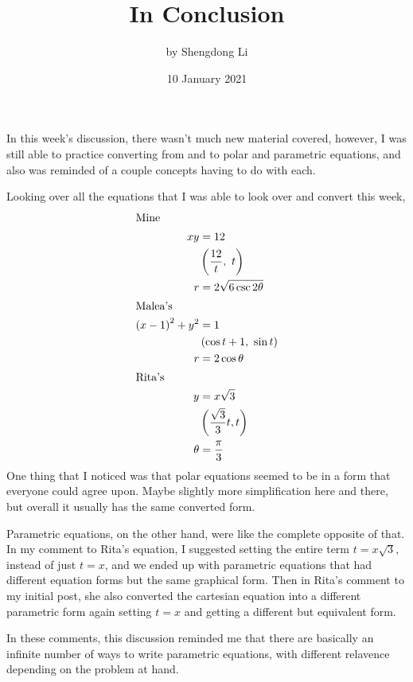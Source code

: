 \documentclass[12pt]{article}
\begin{document}
\title{In Conclusion}
\author{by Shengdong Li}
\date{10 January 2021}
\maketitle

In this week's discussion, there wasn't much new material covered, however, I was still able to practice converting from and to polar and parametric equations, and also was reminded of a couple concepts having to do with each.

Looking over all the equations that I was able to look over and convert this week,
\begin{align*}
  \intertext{Mine}
	xy                         & =12                   \\
	&\left(\frac{12}{t},\ t\right)                      \\
	r                          & =2\sqrt{6\csc2\theta} \\
  \intertext{Malea's}
	\left(x-1\right)^{2}+y^{2} & =1                    \\
	&\left(\cos t+1,\ \sin t\right)                     \\
	r                          & =2\cos\theta          \\
  \intertext{Rita's}
	y                          & =x\sqrt{3}            \\
	&\left(\frac{\sqrt{3}}{3}t,t\right)                 \\
	\theta                     & =\frac{\pi}{3}        \\
\end{align*}
One thing that I noticed was that polar equations seemed to be in a form that everyone could agree upon. Maybe slightly more simplification here and there, but overall it usually has the same converted form.

Parametric equations, on the other hand, were like the complete opposite of that. In my comment to Rita's equation, I suggested setting the entire term \(t=x\sqrt{3}\), instead of just \(t=x\), and we ended up with parametric equations that had different equation forms but the same graphical form. Then in Rita's comment to my initial post, she also converted the cartesian equation into a different parametric form again setting \(t=x\) and getting a different but equivalent form. 


In these comments, this discussion reminded me that there are basically an infinite number of ways to write parametric equations, with different relavence depending on the problem at hand. 
\end{document}
